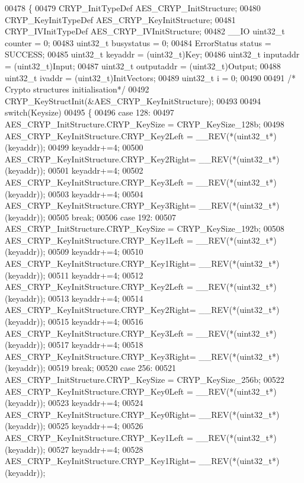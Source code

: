 \begin{DoxyCode}
00478 \{
00479   CRYP_InitTypeDef AES\_CRYP\_InitStructure;
00480   CRYP_KeyInitTypeDef AES\_CRYP\_KeyInitStructure;
00481   CRYP_IVInitTypeDef AES\_CRYP\_IVInitStructure;
00482   \_\_IO uint32\_t counter = 0;
00483   uint32\_t busystatus = 0;
00484   ErrorStatus status = SUCCESS;
00485   uint32\_t keyaddr    = (uint32\_t)Key;
00486   uint32\_t inputaddr  = (uint32\_t)Input;
00487   uint32\_t outputaddr = (uint32\_t)Output;
00488   uint32\_t ivaddr     = (uint32\_t)InitVectors;
00489   uint32\_t i = 0;
00490 
00491   \textcolor{comment}{/* Crypto structures initialisation*/}
00492   CRYP_KeyStructInit(&AES\_CRYP\_KeyInitStructure);
00493 
00494   \textcolor{keywordflow}{switch}(Keysize)
00495   \{
00496     \textcolor{keywordflow}{case} 128:
00497     AES\_CRYP\_InitStructure.CRYP_KeySize = CRYP_KeySize_128b;
00498     AES\_CRYP\_KeyInitStructure.CRYP_Key2Left = \_\_REV(*(uint32\_t*)(keyaddr));
00499     keyaddr+=4;
00500     AES\_CRYP\_KeyInitStructure.CRYP_Key2Right= \_\_REV(*(uint32\_t*)(keyaddr));
00501     keyaddr+=4;
00502     AES\_CRYP\_KeyInitStructure.CRYP_Key3Left = \_\_REV(*(uint32\_t*)(keyaddr));
00503     keyaddr+=4;
00504     AES\_CRYP\_KeyInitStructure.CRYP_Key3Right= \_\_REV(*(uint32\_t*)(keyaddr));
00505     \textcolor{keywordflow}{break};
00506     \textcolor{keywordflow}{case} 192:
00507     AES\_CRYP\_InitStructure.CRYP_KeySize  = CRYP_KeySize_192b;
00508     AES\_CRYP\_KeyInitStructure.CRYP_Key1Left = \_\_REV(*(uint32\_t*)(keyaddr));
00509     keyaddr+=4;
00510     AES\_CRYP\_KeyInitStructure.CRYP_Key1Right= \_\_REV(*(uint32\_t*)(keyaddr));
00511     keyaddr+=4;
00512     AES\_CRYP\_KeyInitStructure.CRYP_Key2Left = \_\_REV(*(uint32\_t*)(keyaddr));
00513     keyaddr+=4;
00514     AES\_CRYP\_KeyInitStructure.CRYP_Key2Right= \_\_REV(*(uint32\_t*)(keyaddr));
00515     keyaddr+=4;
00516     AES\_CRYP\_KeyInitStructure.CRYP_Key3Left = \_\_REV(*(uint32\_t*)(keyaddr));
00517     keyaddr+=4;
00518     AES\_CRYP\_KeyInitStructure.CRYP_Key3Right= \_\_REV(*(uint32\_t*)(keyaddr));
00519     \textcolor{keywordflow}{break};
00520     \textcolor{keywordflow}{case} 256:
00521     AES\_CRYP\_InitStructure.CRYP_KeySize  = CRYP_KeySize_256b;
00522     AES\_CRYP\_KeyInitStructure.CRYP_Key0Left = \_\_REV(*(uint32\_t*)(keyaddr));
00523     keyaddr+=4;
00524     AES\_CRYP\_KeyInitStructure.CRYP_Key0Right= \_\_REV(*(uint32\_t*)(keyaddr));
00525     keyaddr+=4;
00526     AES\_CRYP\_KeyInitStructure.CRYP_Key1Left = \_\_REV(*(uint32\_t*)(keyaddr));
00527     keyaddr+=4;
00528     AES\_CRYP\_KeyInitStructure.CRYP_Key1Right= \_\_REV(*(uint32\_t*)(keyaddr));

\end{DoxyCode}
